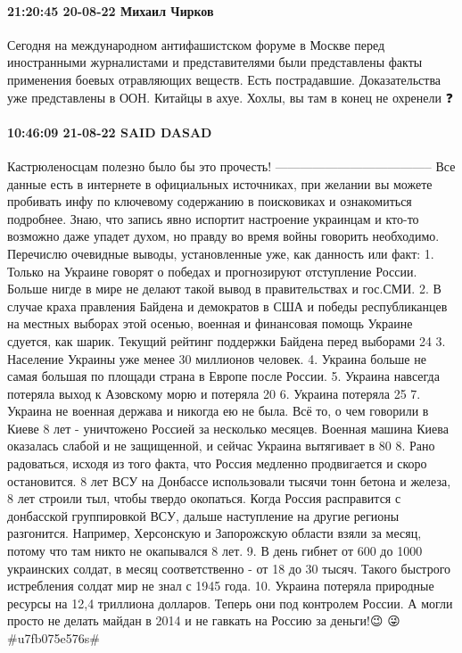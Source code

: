 \paragraph{21:20:45 20-08-22 Михаил Чирков}

Сегодня на международном антифашистском форуме в Москве перед иностранными журналистами и представителями были представлены факты применения боевых отравляющих веществ. Есть пострадавшие. Доказательства уже представлены в ООН.
Китайцы в ахуе.
Хохлы, вы там в конец не охренели ❓

\paragraph{10:46:09 21-08-22 SAID DASAD}

Кастрюленосцам полезно было бы это прочесть!
--------------------------------------
Все данные есть в интернете в официальных источниках, при желании вы можете пробивать инфу по ключевому содержанию в поисковиках и ознакомиться подробнее. Знаю, что запись явно испортит настроение украинцам и кто-то возможно даже упадет духом, но правду во время войны говорить необходимо. Перечислю очевидные выводы, установленные уже, как данность или факт:
1. Только на Украине говорят о победах и прогнозируют отступление России. Больше нигде в мире не делают такой вывод в правительствах и гос.СМИ.
2. В случае краха правления Байдена и демократов в США и победы республиканцев на местных выборах этой осенью, военная и финансовая помощь Украине сдуется, как шарик. Текущий рейтинг поддержки Байдена перед выборами 24%
3. Население Украины уже менее 30 миллионов человек.
4. Украина больше не самая большая по площади страна в Европе после России.
5. Украина навсегда потеряла выход к Азовскому морю и потеряла 20%
6. Украина потеряла 25%
7. Украина не военная держава и никогда ею не была. Всё то, о чем говорили в Киеве 8 лет - уничтожено Россией за несколько месяцев. Военная машина Киева оказалась слабой и не защищенной, и сейчас Украина вытягивает в 80%
8. Рано радоваться, исходя из того факта, что Россия медленно продвигается и скоро остановится. 8 лет ВСУ на Донбассе использовали тысячи тонн бетона и железа, 8 лет строили тыл, чтобы твердо окопаться. Когда Россия расправится с донбасской группировкой ВСУ, дальше наступление на другие регионы разгонится. Например, Херсонскую и Запорожскую области взяли за месяц, потому что там никто не окапывался 8 лет.
9. В день гибнет от 600 до 1000 украинских солдат, в месяц соответственно - от 18 до 30 тысяч. Такого быстрого истребления солдат мир не знал с 1945 года.
10. Украина потеряла природные ресурсы на 12,4 триллиона долларов. Теперь они под контролем России.
А могли просто не делать майдан в 2014 и не гавкать на Россию за деньги!😉 😜 #u7fb075e576s#


